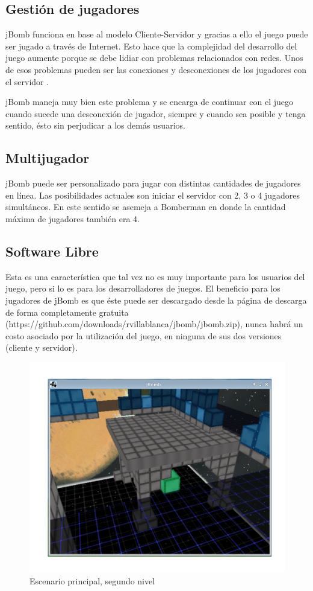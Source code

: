 \documentclass[a4paper,12pt,openany,oneside]{book}
\begin{document}
\subsection{Gestión de jugadores}
jBomb funciona en base al modelo Cliente-Servidor y gracias a ello el juego puede ser jugado a través de Internet. Esto hace que la complejidad del desarrollo del juego aumente porque se debe lidiar con problemas relacionados con redes. Unos de esos problemas pueden ser las conexiones y desconexiones de los jugadores con el servidor \cite{VALVE1}.

jBomb maneja muy bien este problema y se encarga de continuar con el juego cuando sucede una desconexión de jugador, siempre y cuando sea posible y tenga sentido, ésto sin perjudicar a los demás usuarios.
\subsection{Multijugador} 
jBomb puede ser personalizado para jugar con distintas cantidades de jugadores en línea. Las posibilidades actuales son iniciar el servidor con 2, 3 o 4 jugadores simultáneos. En este sentido se asemeja a Bomberman en donde la cantidad máxima de jugadores también era 4.
\subsection{Software Libre}
Esta es una característica que tal vez no es muy importante para los usuarios del juego, pero si lo es para los desarrolladores de juegos.
El beneficio para los jugadores de jBomb es que éste puede ser descargado desde la página de descarga de forma completamente gratuita (https://github.com/downloads/rvillablanca/jbomb/jbomb.zip), nunca habrá un costo asociado por la utilización del juego, en ninguna de sus dos versiones (cliente y servidor).

\begin{figure}
\begin{center}
\includegraphics[scale=.7]{img3.pdf}
\end{center}
\caption[Escenario principal, segundo nivel]{Escenario principal, segundo nivel}
\end{figure}
\end{document}
